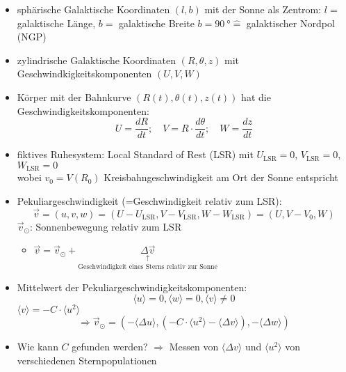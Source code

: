 \begin{itemize}
	\item sphärische Galaktische Koordinaten $(l,b)$ mit der Sonne als Zentrom: $l=$ galaktische Länge, $b=$ galaktische Breite $b=\SI{90}{\degree}\hat{=}$ galaktischer Nordpol (NGP)
	\item zylindrische Galaktische Koordinaten $(R,\theta,z)$ mit Geschwindkigkeitskomponenten $(U,V,W)$
	\item Körper mit der Bahnkurve $(R(t),\theta(t),z(t))$ hat die Geschwindigkeitskomponenten:
		\begin{equation*}
			U=\frac{dR}{dt};\quad V=R\cdot\frac{d\theta}{dt};\quad W=\frac{dz}{dt}
		\end{equation*}
	\item fiktives Ruhesystem: Local Standard of Rest (LSR) mit $U_\text{LSR}=0$, $V_\text{LSR}=0$, $W_\text{LSR}=0$\\
		wobei $v_0=V(R_0)$ Kreisbahngeschwindigkeit am Ort der Sonne entspricht
	\item Pekuliargeschwindigkeit (=Geschwindigkeit relativ zum LSR):
		\begin{equation*}
			\vec{v}=(u,v,w)=(U-U_\text{LSR},V-V_\text{LSR},W-W_\text{LSR})=(U,V-V_0,W)
		\end{equation*}
		$\vec{v}_\odot$: Sonnenbewegung relativ zum LSR
		\begin{itemize}
			\item $\vec{v}=\vec{v}_\odot+\underset{\text{Geschwindigkeit eines Sterns relativ zur Sonne}}{\underset{\uparrow}{\Delta\vec{v}}}$
		\end{itemize}
	\item Mittelwert der Pekuliargeschwindigkeitskomponenten:
		\begin{equation*}
			\langle u\rangle=0,\langle w\rangle=0,\langle v\rangle\neq 0
		\end{equation*}
		$\langle v\rangle = -C\cdot \langle u^2\rangle$
		\begin{equation*}
			\Rightarrow \vec{v}_\odot = (-\langle\Delta u\rangle , (-C\cdot\langle u^2\rangle -\langle\Delta v\rangle),-\langle\Delta w\rangle)
		\end{equation*}
	\item Wie kann $C$ gefunden werden? $\Rightarrow$ Messen von $\langle\Delta v\rangle$ und $\langle u^2\rangle$ von verschiedenen Sternpopulationen
		\begin{figure}[H]
			\begin{multicols}{2}
				\begin{tikzpicture}

\end{tikzpicture}
\end{multicols}
\end{figure}
\end{itemize}
